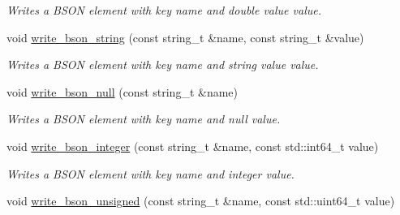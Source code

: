 \begin{DoxyCompactItemize}
\begin{DoxyCompactList}\small\item\em Writes a B\+S\+ON element with key {\itshape name} and double value {\itshape value}. \end{DoxyCompactList}\item 
\mbox{\label{classnlohmann_1_1detail_1_1binary__writer_a5e6574416915208fc035b57338ae3252}} 
void \mbox{\hyperlink{classnlohmann_1_1detail_1_1binary__writer_a5e6574416915208fc035b57338ae3252}{write\+\_\+bson\+\_\+string}} (const string\+\_\+t \&name, const string\+\_\+t \&value)
\begin{DoxyCompactList}\small\item\em Writes a B\+S\+ON element with key {\itshape name} and string value {\itshape value}. \end{DoxyCompactList}\item 
\mbox{\label{classnlohmann_1_1detail_1_1binary__writer_a9927c1110b18661e0224a76156e5a7a9}} 
void \mbox{\hyperlink{classnlohmann_1_1detail_1_1binary__writer_a9927c1110b18661e0224a76156e5a7a9}{write\+\_\+bson\+\_\+null}} (const string\+\_\+t \&name)
\begin{DoxyCompactList}\small\item\em Writes a B\+S\+ON element with key {\itshape name} and null value. \end{DoxyCompactList}\item 
\mbox{\label{classnlohmann_1_1detail_1_1binary__writer_a553ad4dbdf27238eef90867e4bf2f3e5}} 
void \mbox{\hyperlink{classnlohmann_1_1detail_1_1binary__writer_a553ad4dbdf27238eef90867e4bf2f3e5}{write\+\_\+bson\+\_\+integer}} (const string\+\_\+t \&name, const std\+::int64\+\_\+t value)
\begin{DoxyCompactList}\small\item\em Writes a B\+S\+ON element with key {\itshape name} and integer {\itshape value}. \end{DoxyCompactList}\item 
\mbox{\label{classnlohmann_1_1detail_1_1binary__writer_a5e295ed1be6af6260d2a65f7397c3742}} 
void \mbox{\hyperlink{classnlohmann_1_1detail_1_1binary__writer_a5e295ed1be6af6260d2a65f7397c3742}{write\+\_\+bson\+\_\+unsigned}} (const string\+\_\+t \&name, const std\+::uint64\+\_\+t value)

\end{DoxyCompactItemize}
